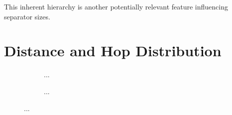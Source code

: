 This inherent hierarchy is another potentially relevant feature influencing separator sizes.





\section{Distance and Hop Distribution}
\label{sec:distance_hop_distribution}



\begin{figure}
	\begin{subfigure}{0.45\linewidth}
		\centering
		\caption{...}
		\label{fig:distance_distribution}
	\end{subfigure}
	\hfill
	\begin{subfigure}{0.45\linewidth}
		\centering
		\caption{...}
		\label{fig:hop_distribution}
	\end{subfigure}
	\caption{...}
	\label{fig:distance_hop_distribution}
\end{figure}



